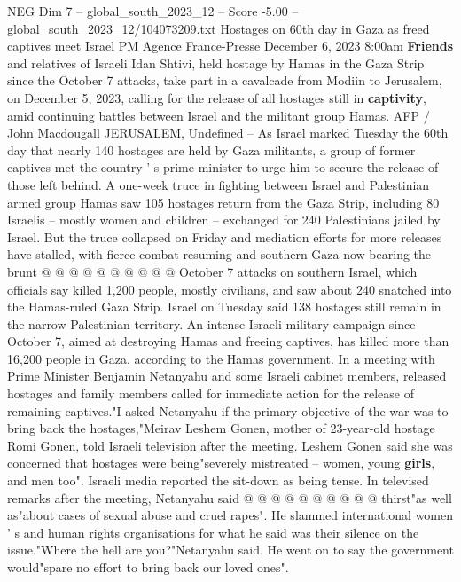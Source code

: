\begin{textsample}{NEG Dim 7 – global\_south\_2023\_12 – Score -5.00 – global\_south\_2023\_12/104073209.txt}  \label{ex:f7_neg_419}
Hostages on 60th day in Gaza as freed captives meet Israel PM Agence France-Presse December 6, 2023 8:00am \textbf{Friends} and relatives of Israeli Idan Shtivi, held hostage by Hamas in the Gaza Strip since the October 7 attacks, take part in a cavalcade from Modiin to Jerusalem, on December 5, 2023, calling for the release of all hostages still in \textbf{captivity}, amid continuing battles between Israel and the militant group Hamas.
AFP / John Macdougall JERUSALEM, Undefined -- As Israel marked Tuesday the 60th day that nearly 140 hostages are held by Gaza militants, a group of former captives met the country ' s prime minister to urge him to secure the release of those left behind.
A one-week truce in fighting between Israel and Palestinian armed group Hamas saw 105 hostages return from the Gaza Strip, including 80 Israelis -- mostly women and children -- exchanged for 240 Palestinians jailed by Israel.
But the truce collapsed on Friday and mediation efforts for more releases have stalled, with fierce combat resuming and southern Gaza now bearing the brunt @ @ @ @ @ @ @ @ @ @ October 7 attacks on southern Israel, which officials say killed 1,200 people, mostly civilians, and saw about 240 snatched into the Hamas-ruled Gaza Strip.
Israel on Tuesday said 138 hostages still remain in the narrow Palestinian territory.
An intense Israeli military campaign since October 7, aimed at destroying Hamas and freeing captives, has killed more than 16,200 people in Gaza, according to the Hamas government.
In a meeting with Prime Minister Benjamin Netanyahu and some Israeli cabinet members, released hostages and family members called for immediate action for the release of remaining captives."I asked Netanyahu if the primary objective of the war was to bring back the hostages,"Meirav Leshem Gonen, mother of 23-year-old hostage Romi Gonen, told Israeli television after the meeting.
Leshem Gonen said she was concerned that hostages were being"severely mistreated -- women, young \textbf{girls}, and men too".
Israeli media reported the sit-down as being tense.
In televised remarks after the meeting, Netanyahu said @ @ @ @ @ @ @ @ @ @ thirst"as well as"about cases of sexual abuse and cruel rapes".
He slammed international women ' s and human rights organisations for what he said was their silence on the issue."Where the hell are you?"Netanyahu said.
He went on to say the government would"spare no effort to bring back our loved ones".

\end{textsample}
